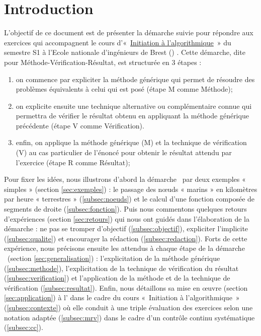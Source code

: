 \documentclass[11pt,a4paper,colorlinks,breaklinks]{article}
\begin{document}
\section{Introduction}
L'objectif de ce document est de présenter la démarche 
suivie pour répondre aux exercices qui accompagnent le cours 
d'«~\href{http://www.enib.fr/~tisseau/pdf/course/info-S1.pdf}{Initiation à l'algorithmique}~» 
du semestre S1 à l'Ecole nationale d'ingénieurs de Brest (\enib) \cite{cours,td}. 
Cette démarche, dite \mvr{} pour Méthode-Vérification-Résultat, est structurée en 3 étapes : 
\begin{enumerate}
\item on commence par expliciter la méthode générique qui permet de résoudre 
	des problèmes équivalents à celui qui est posé 
	(étape M comme Méthode);

\item on explicite ensuite une technique alternative ou complémentaire connue
	qui permettra de vérifier le résultat obtenu en appliquant la méthode générique 
	précédente
	(étape V comme Vérification).

\item enfin, on applique la méthode générique (M) et la technique de vérification (V)
	au cas particulier de l'énoncé pour obtenir le résultat attendu par l'exercice
	(étape R comme Résultat);
\end{enumerate}
Pour fixer les idées, nous illustrons d'abord la démarche \mvr\ par deux exemples « simples »
(section \ref{sec:exemples}) : le passage des n\oe uds « marins » en 
kilomètres par heure « terrestres » (\ref{subsec:noeuds}) et
le calcul d'une fonction composée de segments de droite (\ref{subsec:fonction}).
Puis nous commentons quelques retours d'expériences (section \ref{sec:retours})
qui nous ont guidés dans l'élaboration de la démarche \mvr :
ne pas se tromper d'objectif (\ref{subsec:objectif}), expliciter l'implicite 
(\ref{subsec:qualite}) et encourager la rédaction (\ref{subsec:redaction}).
Forts de cette expérience, nous précisons ensuite les attendus à chaque étape
de la démarche \mvr\ (section \ref{sec:generalisation}) :
l'explicitation de la méthode générique (\ref{subsec:methode}), 
l'explicitation de la technique de vérification du résultat (\ref{subsec:verification})
et l'application de la méthode et de la technique de vérification (\ref{subsec:resultat}).
Enfin, nous détaillons sa mise en \oe uvre (section \ref{sec:application})
à l'\enib{} dans le cadre du cours «~Initiation à l'algorithmique~» (\ref{subsec:contexte})
où elle conduit à une triple évaluation des exercices selon 
une notation adaptée (\ref{subsec:mrv}) dans le cadre d'un contrôle continu systématique
(\ref{subsec:cc}).
\end{document}
